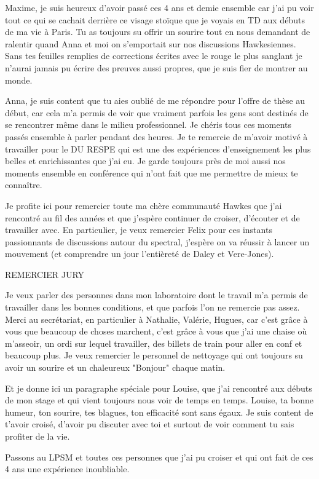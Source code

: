 Maxime, je suis 
heureux d'avoir passé ces 4 ans et demie ensemble car j'ai pu voir tout ce qui se 
cachait derrière ce visage stoïque que je voyais en TD aux débuts de ma vie à Paris. 
Tu as toujours su offrir un sourire tout en nous demandant de ralentir quand Anna et 
moi on s'emportait sur nos discussions Hawkesiennes. Sans tes feuilles remplies de 
corrections écrites avec le rouge le plus sanglant je n'aurai jamais pu écrire des 
preuves aussi propres, que je suis fier de montrer au monde.

Anna, je suis content que tu aies 
oublié de me répondre pour l'offre de thèse au début, car cela m'a permis de voir 
que vraiment parfois les gens sont destinés de se rencontrer même dans le milieu 
professionnel. Je chéris tous ces moments passés ensemble à parler pendant des heures. 
Je te remercie de m'avoir motivé à travailler pour le DU RESPE qui est une des 
expériences d'enseignement les plus belles et enrichissantes que j'ai eu. Je 
garde toujours près de moi aussi nos moments ensemble en conférence qui n'ont fait 
que me permettre de mieux te connaître.

Je profite ici pour remercier toute ma chère communauté Hawkes que j'ai rencontré 
au fil des années et que j'espère continuer de croiser, d'écouter et de travailler 
avec. En particulier, je veux remercier Felix pour ces instants passionnants de 
discussions autour du spectral, j'espère on va réussir à lancer un mouvement (et 
comprendre un jour l'entièreté de Daley et Vere-Jones).

REMERCIER JURY

\vspace{1cm}

Je veux parler des personnes dans mon laboratoire dont le travail m'a permis de 
travailler dans les bonnes conditions, et que parfois l'on ne remercie pas assez. 
Merci au secrétariat, en particulier à 
Nathalie, Valérie, Hugues, car c'est grâce à vous que beaucoup de choses marchent, 
c'est grâce à vous que j'ai une chaise où m'asseoir, un ordi sur lequel travailler,
des billets de train pour aller en conf et beaucoup plus. Je veux remercier le 
personnel de nettoyage qui ont toujours su avoir un sourire et un chaleureux "Bonjour"
chaque matin. 

Et je donne ici un paragraphe spéciale pour Louise, que j'ai rencontré aux débuts de 
mon stage et qui vient toujours nous voir de temps en temps. Louise, ta bonne humeur, 
ton sourire, tes blagues, ton efficacité sont sans égaux. Je suis content de t'avoir 
croisé, d'avoir pu discuter avec toi et surtout de voir comment tu sais profiter de 
la vie.

\vspace{1cm}

Passons au LPSM et toutes ces personnes que j'ai pu croiser et qui ont fait de ces 
4 ans une expérience inoubliable. 
